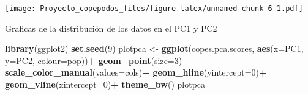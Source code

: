 \documentclass[]{article}
\newenvironment{Shaded}{\begin{snugshade}}{\end{snugshade}}
\newcommand{\DataTypeTok}[1]{\textcolor[rgb]{0.13,0.29,0.53}{#1}}
\newcommand{\DecValTok}[1]{\textcolor[rgb]{0.00,0.00,0.81}{#1}}
\newcommand{\KeywordTok}[1]{\textcolor[rgb]{0.13,0.29,0.53}{\textbf{#1}}}
\newcommand{\NormalTok}[1]{#1}
\newcommand{\OperatorTok}[1]{\textcolor[rgb]{0.81,0.36,0.00}{\textbf{#1}}}
\newcommand{\StringTok}[1]{\textcolor[rgb]{0.31,0.60,0.02}{#1}}
\begin{document}
\begin{Shaded}
\end{Shaded}

\texttt{[image: Proyecto\_copepodos\_files/figure-latex/unnamed-chunk-6-1.pdf]}

\begin{Shaded}
\end{Shaded}

Graficas de la distribución de los datos en el PC1 y PC2

\begin{Shaded}
\begin{Highlighting}[]
\KeywordTok{library}\NormalTok{(ggplot2)}
\KeywordTok{set.seed}\NormalTok{(}\DecValTok{9}\NormalTok{)}
\NormalTok{plotpca <-}\StringTok{ }\KeywordTok{ggplot}\NormalTok{(copes.pca.scores, }\KeywordTok{aes}\NormalTok{(}\DataTypeTok{x=}\NormalTok{PC1, }\DataTypeTok{y=}\NormalTok{PC2, }\DataTypeTok{colour=}\NormalTok{pop))}\OperatorTok{+}
\StringTok{  }\KeywordTok{geom_point}\NormalTok{(}\DataTypeTok{size=}\DecValTok{3}\NormalTok{)}\OperatorTok{+}\StringTok{ }
\StringTok{  }\KeywordTok{scale_color_manual}\NormalTok{(}\DataTypeTok{values=}\NormalTok{cols)}\OperatorTok{+}
\StringTok{  }\KeywordTok{geom_hline}\NormalTok{(}\DataTypeTok{yintercept=}\DecValTok{0}\NormalTok{)}\OperatorTok{+}
\StringTok{  }\KeywordTok{geom_vline}\NormalTok{(}\DataTypeTok{xintercept=}\DecValTok{0}\NormalTok{)}\OperatorTok{+}
\StringTok{  }\KeywordTok{theme_bw}\NormalTok{()}
\NormalTok{plotpca}
\end{Highlighting}
\end{Shaded}
\end{document}
